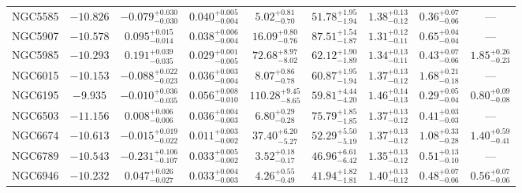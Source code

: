 \documentclass[twocolumn,tighten]{aastex63}
\begin{document}
\begin{table}
\begin{center}
\begin{tabular}{lcccccccc}
    NGC5585 & $ -10.826 $ & $ -0.079 _{ -0.030 } ^{ + 0.030 } $ & $ 0.040 _{ -0.004 } ^{ + 0.005 } $ & $ 5.02 _{ -0.70 } ^{ + 0.81 } $ & $ 51.78 _{ -1.94 } ^{ + 1.95 } $ & $ 1.38 _{ -0.12 } ^{ + 0.13 } $ & $ 0.36 _{ -0.06 } ^{ + 0.07 } $ & --- \\  
    NGC5907 & $ -10.578 $ & $ 0.095 _{ -0.014 } ^{ + 0.015 } $ & $ 0.038 _{ -0.004 } ^{ + 0.006 } $ & $ 16.09 _{ -0.76 } ^{ + 0.80 } $ & $ 87.51 _{ -1.87 } ^{ + 1.54 } $ & $ 1.31 _{ -0.11 } ^{ + 0.12 } $ & $ 0.65 _{ -0.04 } ^{ + 0.04 } $ & --- \\  
    NGC5985 & $ -10.293  $ & $ 0.191 _{ -0.035 } ^{ + 0.039 } $ & $ 0.029 _{ -0.005 } ^{ + 0.001 } $ & $ 72.68 _{ -8.02 } ^{ + 8.97 } $ & $ 62.12 _{ -1.89 } ^{ + 1.90 } $ & $ 1.34 _{ -0.11 } ^{ + 0.13 } $ & $ 0.43 _{ -0.06 } ^{ + 0.07 } $ & $ 1.85 _{ -0.23 } ^{ + 0.26 } $  \\  
    NGC6015 & $ -10.153 $ & $ -0.088 _{ -0.023 } ^{ + 0.022 } $ & $ 0.036 _{ -0.004 } ^{ + 0.003 } $ & $ 8.07 _{ -0.78 } ^{ + 0.86 } $ & $ 60.87 _{ -1.94 } ^{ + 1.95 } $ & $ 1.37 _{ -0.12 } ^{ + 0.13 } $ & $ 1.68 _{ -0.18 } ^{ + 0.21 } $ & --- \\  
    NGC6195 & $ -9.935  $ & $ -0.010 _{ -0.035 } ^{ + 0.036 } $ & $ 0.056 _{ -0.010 } ^{ + 0.008 } $ & $ 110.28 _{ -8.65 } ^{ + 9.45 } $ & $ 59.81 _{ -4.20 } ^{ + 4.44 } $ & $ 1.46 _{ -0.13 } ^{ + 0.14 } $ & $ 0.29 _{ -0.04 } ^{ + 0.05 } $ & $ 0.80 _{ -0.08 } ^{ + 0.09 } $  \\  
    NGC6503 & $ -11.156 $ & $ 0.008 _{ -0.006 } ^{ + 0.006 } $ & $ 0.036 _{ -0.003 } ^{ + 0.004 } $ & $ 6.80 _{ -0.28 } ^{ + 0.29 } $ & $ 75.79 _{ -1.85 } ^{ + 1.85 } $ & $ 1.37 _{ -0.12 } ^{ + 0.13 } $ & $ 0.41 _{ -0.03 } ^{ + 0.03 } $ & --- \\  
    NGC6674 & $ -10.613  $ & $ -0.015 _{ -0.022 } ^{ + 0.019 } $ & $ 0.011 _{ -0.002 } ^{ + 0.003 } $ & $ 37.40 _{ -5.27 } ^{ + 6.20 } $ & $ 52.29 _{ -5.19 } ^{ + 5.50 } $ & $ 1.37 _{ -0.12 } ^{ + 0.13 } $ & $ 1.08 _{ -0.28 } ^{ + 0.33 } $ & $ 1.40 _{ -0.41 } ^{ + 0.59 } $  \\  
    NGC6789 & $ -10.543 $ & $ -0.231 _{ -0.107 } ^{ + 0.106 } $ & $ 0.033 _{ -0.002 } ^{ + 0.005 } $ & $ 3.52 _{ -0.17 } ^{ + 0.18 } $ & $ 46.96 _{ -6.42 } ^{ + 6.61 } $ & $ 1.35 _{ -0.12 } ^{ + 0.13 } $ & $ 0.51 _{ -0.10 } ^{ + 0.13 } $ & --- \\  
    NGC6946 & $ -10.232  $ & $ 0.047 _{ -0.027 } ^{ + 0.026 } $ & $ 0.033 _{ -0.003 } ^{ + 0.004 } $ & $ 4.26 _{ -0.49 } ^{ + 0.55 } $ & $ 41.94 _{ -1.81 } ^{ + 1.82 } $ & $ 1.40 _{ -0.12 } ^{ + 0.13 } $ & $ 0.48 _{ -0.06 } ^{ + 0.07 } $ & $ 0.56 _{ -0.06 } ^{ + 0.07 } $  \\  

\end{tabular}
\end{center}
\end{table}
\end{document}

